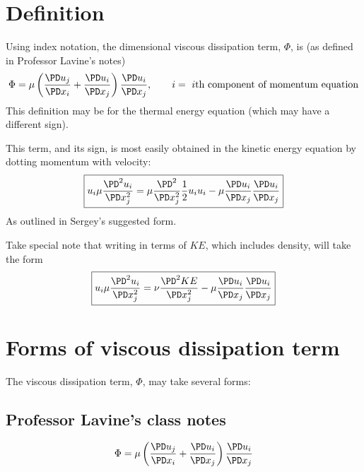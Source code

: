 \documentclass[11pt]{article}
\begin{document}
\doublespacing
\MOONSTITLE
\maketitle

\section{Definition}
Using index notation, the dimensional viscous dissipation term, $\Phi$, is (as defined in Professor Lavine's notes)
\begin{equation}
\Phi=\mu \left( \frac{\PD u_j}{\PD x_i}+\frac{\PD u_i}{\PD x_j} \right) \frac{\PD u_i}{\PD x_j}, \qquad i=\text{ $i$th component of momentum equation}
\end{equation}
This definition may be for the thermal energy equation (which may have a different sign).

This term, and its sign, is most easily obtained in the kinetic energy equation by dotting momentum with velocity:
\begin{equation}
	\boxed{
	u_i \mu \frac{\PD^2 u_i}{\PD x_j^2} =
	\mu \frac{\PD^2}{\PD x_j^2} \frac{1}{2} u_i u_i -
	\mu \frac{\PD u_i}{\PD x_j}\frac{\PD u_i}{\PD x_j}
	}
\end{equation}
As outlined in Sergey's suggested form.

Take special note that writing in terms of $KE$, which includes density, will take the form
\begin{equation}
	\boxed{
	u_i \mu \frac{\PD^2 u_i}{\PD x_j^2} =
	\nu \frac{\PD^2 KE}{\PD x_j^2} -
	\mu \frac{\PD u_i}{\PD x_j}\frac{\PD u_i}{\PD x_j}
	}
\end{equation}

\section{Forms of viscous dissipation term}
The viscous dissipation term, $\Phi$, may take several forms:

\subsection{Professor Lavine's class notes}
\begin{equation}
\Phi=\mu \left( \frac{\PD u_j}{\PD x_i}+\frac{\PD u_i}{\PD x_j} \right) \frac{\PD u_i}{\PD x_j}
\end{equation}
\end{document}
